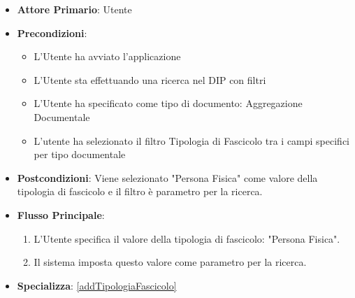 \begin{itemize}
      \item \textbf{Attore Primario}: Utente
      \item \textbf{Precondizioni}: 
      \begin{itemize}            
            \item L'Utente ha avviato l'applicazione
            \item L'Utente sta effettuando una ricerca nel DIP con filtri
            \item L'Utente ha specificato come tipo di documento: Aggregazione Documentale
            \item L'utente ha selezionato il filtro Tipologia di Fascicolo tra i campi specifici per tipo documentale
      \end{itemize}
      \item \textbf{Postcondizioni}: Viene selezionato "Persona Fisica" come valore della tipologia di fascicolo e il filtro è parametro per la ricerca.
      \item \textbf{Flusso Principale}:
            \begin{enumerate}
                  \item L'Utente specifica il valore della tipologia di fascicolo: "Persona Fisica".
                  \item Il sistema imposta questo valore come parametro per la ricerca.
            \end{enumerate}
      \item \textbf{Specializza}: \ref{addTipologiaFascicolo}
\end{itemize}

